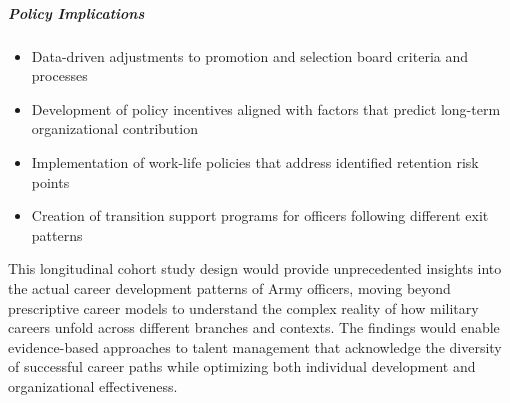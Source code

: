 \documentclass[../main.tex]{subfiles}
\begin{document}
\subparagraph{Policy Implications}
\begin{itemize}
\item Data-driven adjustments to promotion and selection board criteria and processes
\item Development of policy incentives aligned with factors that predict long-term organizational contribution
\item Implementation of work-life policies that address identified retention risk points
\item Creation of transition support programs for officers following different exit patterns
\end{itemize}

This longitudinal cohort study design would provide unprecedented insights into the actual career development patterns of Army officers, moving beyond prescriptive career models to understand the complex reality of how military careers unfold across different branches and contexts. The findings would enable evidence-based approaches to talent management that acknowledge the diversity of successful career paths while optimizing both individual development and organizational effectiveness.



\end{document}
